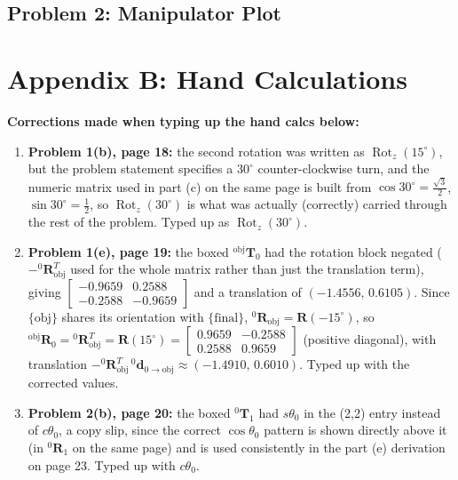 \documentclass[11pt]{article}
\newcommand{\T}{\bm{T}}
\newcommand{\R}{\bm{R}}
\newcommand{\dvec}{\bm{d}}
\newcommand{\Rotz}{\operatorname{Rot}_z}
\begin{document}
\newpage
\subsection*{Problem 2: Manipulator Plot}


\newpage
\section*{Appendix B: Hand Calculations}

\begin{fixnote}
\textbf{Corrections made when typing up the hand calcs below:}
\begin{enumerate}[leftmargin=1.2em, itemsep=4pt]
    \item \textbf{Problem 1(b), page 18:} the second rotation was written as $\Rotz(15^\circ)$, but the problem statement specifies a $30^\circ$ counter-clockwise turn, and the numeric matrix used in part (c) on the same page is built from $\cos 30^\circ=\tfrac{\sqrt3}{2}$, $\sin30^\circ=\tfrac12$, so $\Rotz(30^\circ)$ is what was actually (correctly) carried through the rest of the problem. Typed up as $\Rotz(30^\circ)$.
    \item \textbf{Problem 1(e), page 19:} the boxed $^{\textrm{obj}}\T_0$ had the rotation block negated ($-{}^{0}\R_{\textrm{obj}}^{T}$ used for the whole matrix rather than just the translation term), giving $\begin{bmatrix}-0.9659&0.2588\\-0.2588&-0.9659\end{bmatrix}$ and a translation of $(-1.4556,\,0.6105)$. Since $\{\textrm{obj}\}$ shares its orientation with $\{\textrm{final}\}$, $^{0}\R_{\textrm{obj}}=\R(-15^\circ)$, so $^{\textrm{obj}}\R_0={}^{0}\R_{\textrm{obj}}^{T}=\R(15^\circ)=\begin{bmatrix}0.9659&-0.2588\\0.2588&0.9659\end{bmatrix}$ (positive diagonal), with translation $-{}^{0}\R_{\textrm{obj}}^{T}\,{}^{0}\dvec_{0\to\textrm{obj}}\approx(-1.4910,\,0.6010)$. Typed up with the corrected values.
    \item \textbf{Problem 2(b), page 20:} the boxed $^{0}\T_1$ had $s\theta_0$ in the (2,2) entry instead of $c\theta_0$, a copy slip, since the correct $\cos\theta_0$ pattern is shown directly above it (in $^{0}\R_1$ on the same page) and is used consistently in the part (e) derivation on page 23. Typed up with $c\theta_0$.
\end{enumerate}
\end{fixnote}


\end{document}

